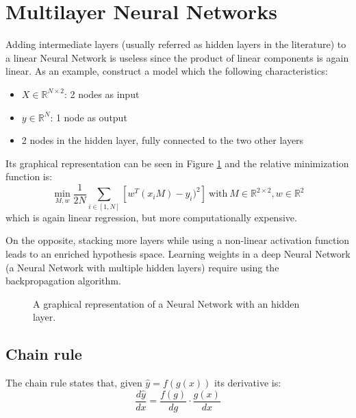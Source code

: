 \section{Multilayer Neural Networks}
Adding intermediate layers (usually referred as hidden layers in the literature)
to a linear Neural Network is useless
since the product of linear components is again linear.
As an example, construct a model which the following characteristics:
\begin{itemize}
    \item $X \in \mathbb{R}^{N \times 2}$: 2 nodes as input
    \item $y \in \mathbb{R}^N$: 1 node as output
    \item 2 nodes in the hidden layer, fully connected to the two other layers
\end{itemize}
Its graphical representation can be seen in Figure \ref{fig:nn-multi}
and the relative minimization function is:
$$ \displaystyle \min_{M, w} \frac{1}{2N} \sum_{i \in [1, N]} [ w^T (x_i M) - y_i)^2 ]
    \ \text{with} \
    M \in \mathbb{R}^{2 \times 2}, w \in \mathbb{R}^{2}$$
which is again linear regression, but more computationally expensive.

On the opposite, stacking more layers while using a non-linear activation function
leads to an enriched hypothesis space. Learning weights in a deep Neural Network
(a Neural Network with multiple hidden layers) require using the backpropagation algorithm.

\begin{figure}[h]
    \centering
    \caption{A graphical representation of a Neural Network with an hidden layer.}
    \label{fig:nn-multi}
\end{figure}

\subsection{Chain rule}
The chain rule states that, given $\hat{y} = f(g(x))$ its derivative is:
$$ \frac{d\hat{y}}{dx} = \frac{f(g)}{dg} \cdot \frac{g(x)}{dx} $$

